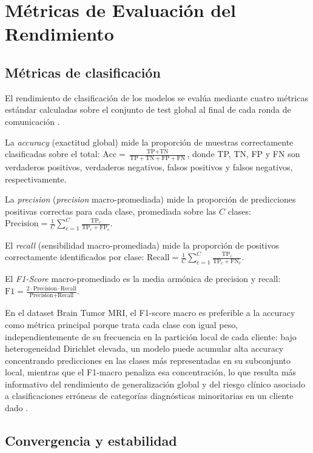 \section{M\'etricas de Evaluaci\'on del Rendimiento}

\subsection{Métricas de clasificación}

El rendimiento de clasificación de los modelos se evalúa mediante cuatro métricas estándar
calculadas sobre el conjunto de test global al final de cada ronda de comunicación
\cite{sokolova2009systematic}.

La \textit{accuracy} (exactitud global) mide la proporción de muestras correctamente
clasificadas sobre el total:
$\text{Acc} = \frac{\text{TP} + \text{TN}}{\text{TP} + \text{TN} + \text{FP} + \text{FN}}$,
donde TP, TN, FP y FN son verdaderos positivos, verdaderos negativos, falsos positivos y
falsos negativos, respectivamente.

La \textit{precision} (\textit{precision} macro-promediada) mide la proporción de predicciones
positivas correctas para cada clase, promediada sobre las $C$ clases:
$\text{Precision} = \frac{1}{C}\sum_{c=1}^C \frac{\text{TP}_c}{\text{TP}_c + \text{FP}_c}$.

El \textit{recall} (sensibilidad macro-promediada) mide la proporción de positivos correctamente
identificados por clase:
$\text{Recall} = \frac{1}{C}\sum_{c=1}^C \frac{\text{TP}_c}{\text{TP}_c + \text{FN}_c}$.

El \textit{F1-Score} macro-promediado es la media armónica de precision y recall:
$\text{F1} = \frac{2 \cdot \text{Precision} \cdot \text{Recall}}{\text{Precision} + \text{Recall}}$.

En el dataset Brain Tumor MRI, el F1-score macro es preferible a la accuracy como métrica
principal porque trata cada clase con igual peso, independientemente de su frecuencia en la
partición local de cada cliente: bajo heterogeneidad Dirichlet elevada, un modelo puede
acumular alta accuracy concentrando predicciones en las clases más representadas en su
subconjunto local, mientras que el F1-macro penaliza esa concentración, lo que resulta más
informativo del rendimiento de generalización global y del riesgo clínico asociado a
clasificaciones erróneas de categorías diagnósticas minoritarias en un cliente dado
\cite{noor2026federated, appasami2025federated}.

\subsection{Convergencia y estabilidad}

